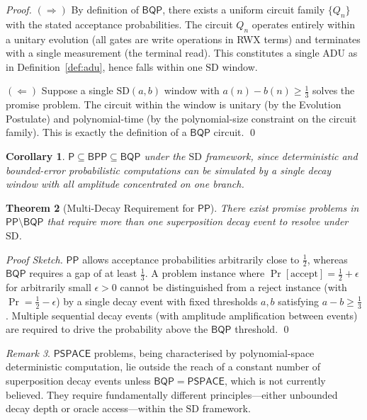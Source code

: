 \documentclass[12pt, a4paper]{article}
\theoremstyle{plain}
\newtheorem{theorem}{Theorem}[section]
\newtheorem{corollary}[theorem]{Corollary}
\theoremstyle{definition}
\theoremstyle{remark}
\newtheorem{remark}[theorem]{Remark}
\newcommand{\pspace}{\ensuremath{\mathsf{PSPACE}}}
\newcommand{\bqp}{\ensuremath{\mathsf{BQP}}}
\newcommand{\bpp}{\ensuremath{\mathsf{BPP}}}
\newcommand{\pp}{\ensuremath{\mathsf{PP}}}
\newcommand{\Pcls}{\ensuremath{\mathsf{P}}}
\newcommand{\SD}{\ensuremath{\mathrm{SD}}}   %
\begin{document}
\begin{proof}
  $(\Rightarrow)$ By definition of $\bqp$, there exists a uniform circuit
  family $\{Q_n\}$ with the stated acceptance probabilities.  The circuit
  $Q_n$ operates entirely within a unitary evolution (all gates are write
  operations in RWX terms) and terminates with a single measurement (the
  terminal read).  This constitutes a single ADU as in
  Definition~\ref{def:adu}, hence falls within one \SD{} window.

  $(\Leftarrow)$ Suppose a single \SD$(a,b)$ window with $a(n) - b(n) \geq
  \tfrac{1}{3}$ solves the promise problem.  The circuit within the window is
  unitary (by the Evolution Postulate) and polynomial-time (by the
  polynomial-size constraint on the circuit family).  This is exactly the
  definition of a $\bqp$ circuit. \qed
\end{proof}

\begin{corollary}
  $\Pcls \subseteq \bpp \subseteq \bqp$ under the \SD{} framework, since
  deterministic and bounded-error probabilistic computations can be simulated
  by a single decay window with all amplitude concentrated on one branch.
\end{corollary}

\begin{theorem}[Multi-Decay Requirement for \pp]
  \label{thm:pp}
  There exist promise problems in $\pp \setminus \bqp$ that require more than
  one superposition decay event to resolve under \SD.
\end{theorem}

\begin{proof}[Proof Sketch]
  $\pp$ allows acceptance probabilities arbitrarily close to $\tfrac{1}{2}$,
  whereas $\bqp$ requires a gap of at least $\tfrac{1}{3}$.  A problem
  instance where $\Pr[\text{accept}] = \tfrac{1}{2} + \epsilon$ for
  arbitrarily small $\epsilon > 0$ cannot be distinguished from a reject
  instance (with $\Pr = \tfrac{1}{2} - \epsilon$) by a single decay event
  with fixed thresholds $a, b$ satisfying $a - b \geq \tfrac{1}{3}$.  Multiple
  sequential decay events (with amplitude amplification between events) are
  required to drive the probability above the \bqp{} threshold. \qed
\end{proof}

\begin{remark}
  $\pspace$ problems, being characterised by polynomial-space deterministic
  computation, lie outside the reach of a constant number of superposition
  decay events unless $\bqp = \pspace$, which is not currently believed.
  They require fundamentally different principles---either unbounded decay
  depth or oracle access---within the \SD{} framework.
\end{remark}
\end{document}
